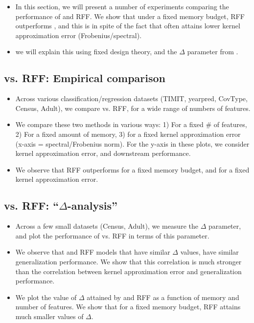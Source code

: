 \begin{itemize}
	\item In this section, we will present a number of experiments comparing the performance of \Nystrom and RFF.  We show that under a fixed memory budget, RFF outperforms \NystromNS, and this is in spite of the fact that \Nystrom often attains lower kernel approximation error (Frobenius/spectral).
	\item we will explain this using fixed design theory, and the $\Delta$ parameter from \citep{avron17}.
\end{itemize}

\subsection{\Nystrom vs. RFF: Empirical comparison}
\begin{itemize}
	\item Across various classification/regression datasets (TIMIT, yearpred, CovType, Census, Adult), we compare \Nystrom vs. RFF, for a wide range of numbers of features.
	\item We compare these two methods in various ways: 1) For a fixed \# of features, 2) For a fixed amount of memory, 3) for a fixed kernel approximation error (x-axis = spectral/Frobenius norm).  For the y-axis in these plots, we consider kernel approximation error, and downstream performance.
	\item We observe that RFF outperforms \Nystrom for a fixed memory budget, and for a fixed kernel approximation error.
\end{itemize}

\subsection{\Nystrom vs. RFF: ``$\Delta$-analysis''}
\begin{itemize}
	\item Across a few small datasets (Census, Adult), we measure the $\Delta$ parameter, and plot the performance of \Nystrom vs. RFF in terms of this parameter.
	\item We observe that \Nystrom and RFF models that have similar $\Delta$ values, have similar generalization performance.  We show that this correlation is much stronger than the correlation between kernel approximation error and generalization performance.
	\item We plot the value of $\Delta$ attained by \Nystrom and RFF as a function of memory and number of features.  We show that for a fixed memory budget, RFF attains much smaller values of $\Delta$.
\end{itemize}
